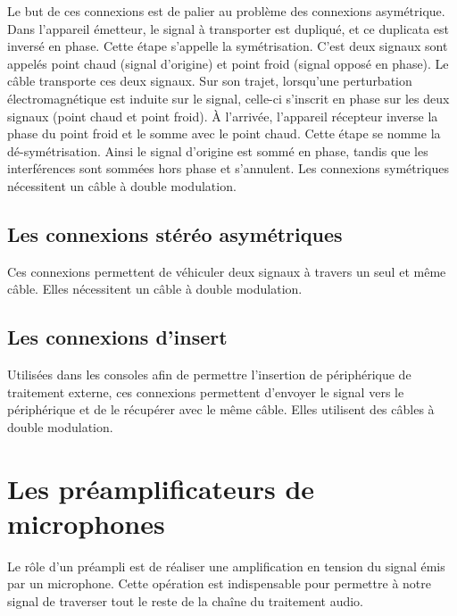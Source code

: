 \documentclass[
]{book}
\begin{document}
Le but de ces connexions est de palier au problème des connexions asymétrique. Dans l'appareil émetteur, le signal à transporter est dupliqué, et ce duplicata est inversé en phase. Cette étape s'appelle la symétrisation. C'est deux signaux sont appelés point chaud (signal d'origine) et point froid (signal opposé en phase). Le câble transporte ces deux signaux. Sur son trajet, lorsqu'une perturbation électromagnétique est induite sur le signal, celle-ci s'inscrit en phase sur les deux signaux (point chaud et point froid). À l'arrivée, l'appareil récepteur inverse la phase du point froid et le somme avec le point chaud. Cette étape se nomme la dé-symétrisation. Ainsi le signal d'origine est sommé en phase, tandis que les interférences sont sommées hors phase et s'annulent.
Les connexions symétriques nécessitent un câble à double modulation.

\hypertarget{les-connexions-stuxe9ruxe9o-asymuxe9triques}{%
\section{Les connexions stéréo asymétriques}\label{les-connexions-stuxe9ruxe9o-asymuxe9triques}}

Ces connexions permettent de véhiculer deux signaux à travers un seul et même câble. Elles nécessitent un câble à double modulation.

\hypertarget{les-connexions-dinsert}{%
\section{Les connexions d'insert}\label{les-connexions-dinsert}}

Utilisées dans les consoles afin de permettre l'insertion de périphérique de traitement externe, ces connexions permettent d'envoyer le signal vers le périphérique et de le récupérer avec le même câble. Elles utilisent des câbles à double modulation.

\hypertarget{les-pruxe9amplificateurs-de-microphones}{%
\chapter{Les préamplificateurs de microphones}\label{les-pruxe9amplificateurs-de-microphones}}

Le rôle d'un préampli est de réaliser une amplification en tension du signal émis par un microphone. Cette opération est indispensable pour permettre à notre signal de traverser tout le reste de la chaîne du traitement audio.
\end{document}
